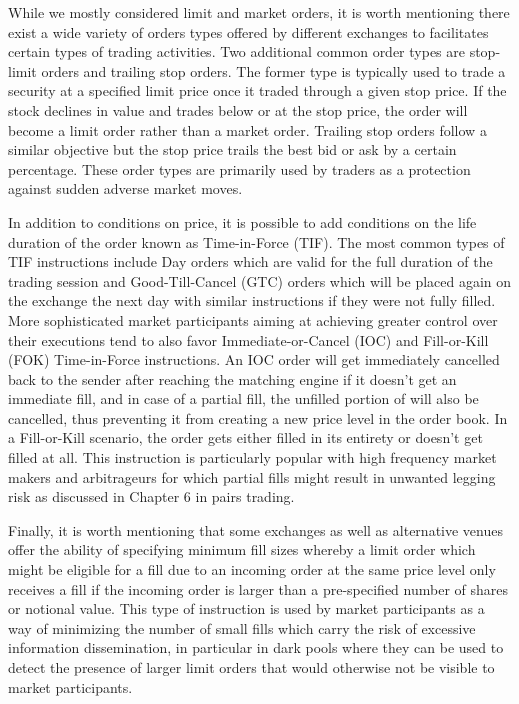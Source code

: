 While we mostly considered limit and market orders, it is worth mentioning there exist a wide variety of orders types offered by different exchanges to facilitates certain types of trading activities. Two additional common order types are stop-limit orders and trailing stop orders. The former type is typically used to trade a security at a specified limit price once it traded through a given stop price. If the stock declines in value and trades below or at the stop price, the order will become a limit order rather than a market order. Trailing stop orders follow a similar objective but the stop price trails the best bid or ask by a certain percentage. These order types are primarily used by traders as a protection against sudden adverse market moves.


In addition to conditions on price, it is possible to add conditions on the life duration of the order known as Time-in-Force (TIF). The most common types of TIF instructions include Day orders which are valid for the full duration of the trading session and Good-Till-Cancel (GTC) orders which will be placed again on the exchange the next day with similar instructions if they were not fully filled. More sophisticated market participants aiming at achieving greater control over their executions tend to also favor Immediate-or-Cancel (IOC) and Fill-or-Kill (FOK) Time-in-Force instructions. An IOC order will get immediately cancelled back to the sender after reaching the matching engine if it doesn't get an immediate fill, and in case of a partial fill, the unfilled portion of will also be cancelled, thus preventing it from creating a new price level in the order book. In a Fill-or-Kill scenario, the order gets either filled in its entirety or doesn't get filled at all. This instruction is particularly popular with high frequency market makers and arbitrageurs for which partial fills might result in unwanted legging risk as discussed in Chapter 6 in pairs trading.


Finally, it is worth mentioning that some exchanges as well as alternative venues offer the ability of specifying minimum fill sizes whereby a limit order which might be eligible for a fill due to an incoming order at the same price level only receives a fill if the incoming order is larger than a pre-specified number of shares or notional value. This type of instruction is used by market participants as a way of minimizing the number of small fills which carry the risk of excessive information dissemination, in particular in dark pools where they can be used to detect the presence of larger limit orders that would otherwise not be visible to market participants.  



